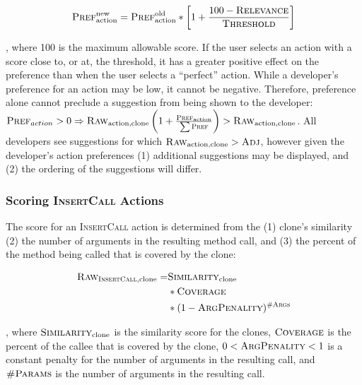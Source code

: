 \documentclass[nocopyrightspace,10pt]{sigplanconf}
\begin{document}
\begin{equation*}
  \textsc{Pref}^{\text{new}}_{\text{action}} = \textsc{Pref}^{\text{old}}_{\text{action}} * \left[ 1 + \frac{100 - \textsc{Relevance}}{\textsc{Threshold}} \right]
\end{equation*}

\noindent, where 100 is the maximum allowable
score. If the user selects an action with a score close to, or at, the
threshold, it has a greater positive effect on the preference than
when the user selects a ``perfect'' action.
While a developer's preference for an action may be low, it cannot be
negative. Therefore, preference alone cannot preclude a suggestion
from being shown to the developer: $\textsc{Pref}_{action} > 0 \Rightarrow
\textsc{Raw}_{\text{action,clone}}\left(1 + \frac{\textsc{Pref}_{\text{action}}}{\sum{\textsc{Pref}}}\right) > \textsc{Raw}_{\text{action,clone}}$.
All developers see suggestions for which $\textsc{Raw}_{\text{action,clone}} > \textsc{Adj}$,
however given the developer's action preferences (1) additional
suggestions may be displayed, and (2) the ordering of the suggestions
will differ.

\subsubsection{Scoring \textsc{InsertCall} Actions}
\label{sec:call}
The score for an \textsc{InsertCall} action is determined
from the (1) clone's similarity (2) the number of arguments in the
resulting method call, and (3) the percent of the method being called
that is covered by the clone:

\begin{align*}
  \textsc{Raw}_{\textsc{InsertCall}, \text{clone}} = & \textsc{Similarity}_{\text{clone}} \\ 
   & * \textsc{Coverage}  \\
   & * (1 - \textsc{ArgPenality})^{\textsc{\#Args}}
\end{align*}

\noindent, where $\textsc{Similarity}_{\text{clone}}$ is the similarity score for the clones, 
$\textsc{Coverage}$ is
the percent of the callee that is covered by the clone, $0 < \textsc{ArgPenality} < 1$ is a constant
penalty for the number of arguments in the resulting call, and $\textsc{\#Params}$ is
the number of arguments in the resulting call. 
\end{document}
